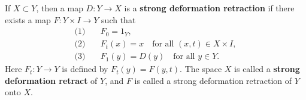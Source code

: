 If $X \subset Y$, then a map $D: Y \to X$ is a \textbf{strong deformation retraction} if there exists a map $F: Y \times I \to Y$ such that
\begin{align*}
\text{(1)}&\quad F_0 = 1_Y,\\[4pt]
\text{(2)}&\quad F_t(x) = x \quad \text{for all } (x,t) \in X \times I,\\[4pt]
\text{(3)}&\quad F_1(y) = D(y) \quad \text{for all } y \in Y.
\end{align*}
Here $F_t: Y \to Y$ is defined by $F_t(y) = F(y,t)$. The space $X$ is called a \textbf{strong deformation retract} of $Y$, and $F$ is called a strong deformation retraction of $Y$ onto $X$.
